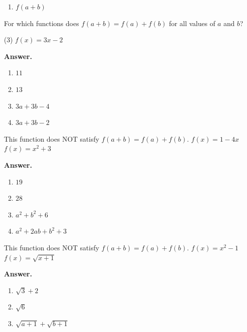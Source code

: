 \documentclass[10pt,]{book}
\theoremstyle{plain}
\theoremstyle{definition}
\theoremstyle{definition}
\theoremstyle{definition}
\begin{document}
\begin{exerciselist}
\begin{multicols}{4}
\begin{enumerate}[label=\alph*]
\item\hypertarget{li-307}{}\(f (a + b)\)%
\end{enumerate}
\end{multicols}
 For which functions does \(f (a + b) = f (a) + f (b)\) for all values of \(a\) and \(b\)?%
\begin{exercisegroup}(3)
\exercise[69.]\hypertarget{exercise-79}{}\(f (x) = 3x - 2\)%
\par\smallskip
\noindent\textbf{Answer.}\hypertarget{answer-45}{}\quad
\leavevmode%
\begin{multicols}{2}
\begin{enumerate}[label=\alph*]
\item\hypertarget{li-308}{}\(11\)%
\item\hypertarget{li-309}{}\(13\)%
\item\hypertarget{li-310}{}\(3a + 3b - 4\)%
\item\hypertarget{li-311}{}\(3a + 3b - 2 \)%
\end{enumerate}
\end{multicols}
 This function does NOT satisfy \(f (a + b) = f (a) + f (b)\).%
\exercise[70.]\hypertarget{exercise-80}{}\(f (x) = 1 - 4x\)%
\exercise[71.]\hypertarget{exercise-81}{}\(f (x) = x^2 + 3\)%
\par\smallskip
\noindent\textbf{Answer.}\hypertarget{answer-46}{}\quad
\leavevmode%
\begin{multicols}{2}
\begin{enumerate}[label=\alph*]
\item\hypertarget{li-312}{}\(19\)%
\item\hypertarget{li-313}{}\(28\)%
\item\hypertarget{li-314}{}\(a^2 + b^2 + 6\)%
\item\hypertarget{li-315}{}\(a^2 + 2ab + b^2 + 3 \)%
\end{enumerate}
\end{multicols}
 This function does NOT satisfy \(f (a + b) = f (a) + f (b)\).%
\exercise[72.]\hypertarget{exercise-82}{}\(f (x) = x^2 - 1\)%
\exercise[73.]\hypertarget{exercise-83}{}\(f (x) =\sqrt{x+1} \)%
\par\smallskip
\noindent\textbf{Answer.}\hypertarget{answer-47}{}\quad
\leavevmode%
\begin{multicols}{2}
\begin{enumerate}[label=\alph*]
\item\hypertarget{li-316}{}\(\sqrt{3}+2 \)%
\item\hypertarget{li-317}{}\(\sqrt{6} \)%
\item\hypertarget{li-318}{}\(\sqrt{a+1}+\sqrt{b+1} \)%

\end{enumerate}
\end{multicols}
\end{exercisegroup}
\end{exerciselist}
\end{document}

